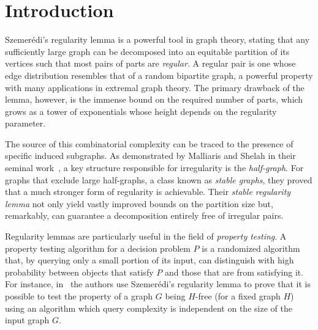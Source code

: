 \section{Introduction} \label{sec:introduction}


Szemer\'edi's regularity lemma is a powerful tool in graph theory, stating that any sufficiently large graph can be
decomposed into an equitable partition of its vertices such that most pairs of parts are \emph{regular}.
A regular pair is one whose edge distribution resembles that of a random bipartite graph, a powerful property with many
applications in extremal graph theory.
The primary drawback of the lemma, however, is the immense bound on the required number of parts, which grows as a tower
of exponentials whose height depends on the regularity parameter.

The source of this combinatorial complexity can be traced to the presence of specific induced subgraphs.
As demonstrated by Malliaris and Shelah in their seminal work~\cite{regularity_lemmas_for_stable_graphs}, a key structure
responsible for irregularity is the \emph{half-graph}.
For graphs that exclude large half-graphs, a class known as \emph{stable graphs}, they proved that a much stronger form
of regularity is achievable.
Their \emph{stable regularity lemma} not only yield vastly improved bounds on the partition size but, remarkably,
can guarantee a decomposition entirely free of irregular pairs.

Regularity lemmas are particularly useful in the field of \emph{property testing}.
A property testing algorithm for a decision problem $P$ is a randomized algorithm that, by querying only a small portion
of its input, can distinguish with high probability between objects that satisfy $P$ and those that are  from
satisfying it.
For instance, in~\cite{efficient_testing_of_large_graphs} the authors use Szemer\'edi's regularity lemma
to prove that it is possible to test the property of a graph $G$ being $H$-free (for a fixed graph $H$) using an algorithm
which query complexity is independent on the size of the input graph $G$.

